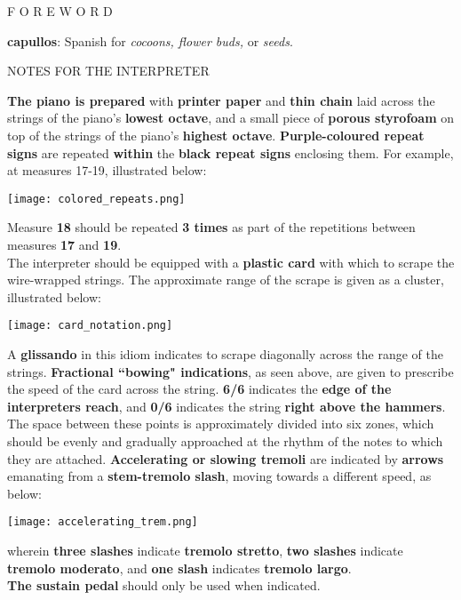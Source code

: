 \documentclass[12pt]{article}
\newcommand*\circled[1]{\tikz[baseline=(char.base)]{
            \node[shape=circle,draw,inner sep=1pt] (char) {#1};}}
\begin{document}
\begingroup
\begin{center}
\huge F O R E W O R D
\end{center}
\endgroup

\begingroup
\begin{center}
\textbf{capullos}: Spanish for \textit{cocoons, flower buds,} or \textit{seeds}.
\end{center}
\endgroup

\vspace{1\baselineskip}

\begingroup
\begin{center}
\huge NOTES FOR THE INTERPRETER
\end{center}
\endgroup

\begingroup
\textbf{\circled{1} The piano is prepared} with \textbf{printer paper} and \textbf{thin chain} laid across the strings of the piano's \textbf{lowest octave}, and a small piece of \textbf{porous styrofoam} on top of the strings of the piano's \textbf{highest octave}. \textbf{\circled{2} Purple-coloured repeat signs} are repeated \textbf{within} the \textbf{black repeat signs} enclosing them. For example, at measures 17-19, illustrated below: \\
\begin{center}
\texttt{[image: colored\_repeats.png]}\\
\end{center}
Measure \textbf{18} should be repeated \textbf{3 times} as part of the repetitions between measures \textbf{17} and \textbf{19}. \\
\textbf{\circled{3}} The interpreter should be equipped with a \textbf{plastic card} with which to scrape the wire-wrapped strings. The approximate range of the scrape is given as a cluster, illustrated below: \\
\begin{center}
\texttt{[image: card\_notation.png]}\\
\end{center} 
A \textbf{glissando} in this idiom indicates to scrape diagonally across the range of the strings. \textbf{\circled{4} Fractional ``bowing" indications}, as seen above, are given to prescribe the speed of the card across the string. \textbf{6/6} indicates the \textbf{edge of the interpreters reach}, and \textbf{0/6} indicates the string \textbf{right above the hammers}. The space between these points is approximately divided into six zones, which should be evenly and gradually approached at the rhythm of the notes to which they are attached. \textbf{\circled{5} Accelerating or slowing tremoli} are indicated by \textbf{arrows} emanating from a \textbf{stem-tremolo slash}, moving towards a different speed, as below: \\
\begin{center}
\texttt{[image: accelerating\_trem.png]}\\
\end{center} 
wherein \textbf{three slashes} indicate \textbf{tremolo stretto}, \textbf{two slashes} indicate \textbf{tremolo moderato}, and \textbf{one slash} indicates \textbf{tremolo largo}. \\
\textbf{\circled{6} The sustain pedal} should only be used when indicated. 
\endgroup
\end{document}
